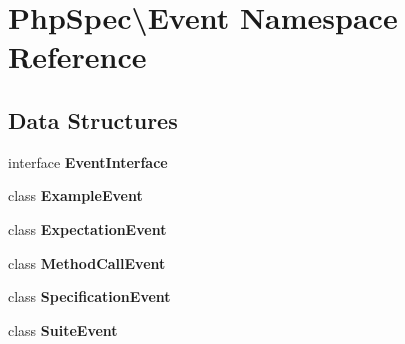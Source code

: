 \section{Php\+Spec\textbackslash{}Event Namespace Reference}
\label{namespace_php_spec_1_1_event}
\subsection*{Data Structures}
\begin{DoxyCompactItemize}
\item 
interface {\bf Event\+Interface}
\item 
class {\bf Example\+Event}
\item 
class {\bf Expectation\+Event}
\item 
class {\bf Method\+Call\+Event}
\item 
class {\bf Specification\+Event}
\item 
class {\bf Suite\+Event}
\end{DoxyCompactItemize}
